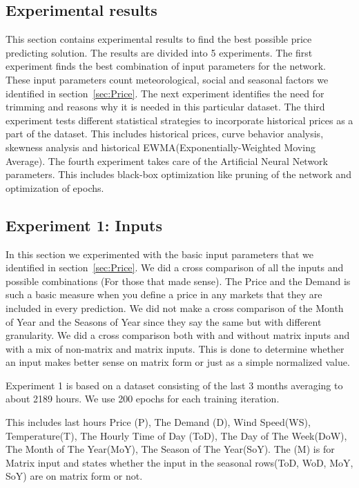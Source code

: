 \subsection{Experimental results}
This section contains experimental results to find the best possible price predicting solution. The results are divided into 5 experiments. The first experiment finds the best combination of input parameters for the network. These input parameters count meteorological, social and seasonal factors we identified in section~\ref{sec:Price}. The next experiment identifies the need for trimming and reasons why it is needed in this particular dataset. The third experiment tests different statistical strategies to incorporate historical prices as a part of the dataset. This includes historical prices, curve behavior analysis, skewness analysis and historical EWMA(Exponentially-Weighted Moving Average). The fourth experiment takes care of the Artificial Neural Network parameters. This includes black-box optimization like pruning of the network and optimization of epochs.

\subsection{Experiment 1: Inputs}
In this section we experimented with the basic input parameters that we identified in section~\ref{sec:Price}. We did a cross comparison of all the inputs and possible combinations (For those that made sense). The Price and the Demand is such a basic measure when you define a price in any markets that they are included in every prediction. We did not make a cross comparison of the Month of Year and the Seasons of Year since they say the same but with different granularity. We did a cross comparison both with and without matrix inputs and with a mix of non-matrix and matrix inputs. This is done to determine whether an input makes better sense on matrix form or just as a simple normalized value. 

Experiment 1 is based on a dataset consisting of the last 3 months averaging to about 2189 hours. We use 200 epochs for each training iteration.

This includes last hours Price (P), The Demand (D), Wind Speed(WS), Temperature(T), The Hourly Time of Day (ToD), The Day of The Week(DoW), The Month of The Year(MoY), The Season of The Year(SoY). The (M) is for Matrix input and states whether the input in the seasonal rows(ToD, WoD, MoY, SoY) are on matrix form or not.


